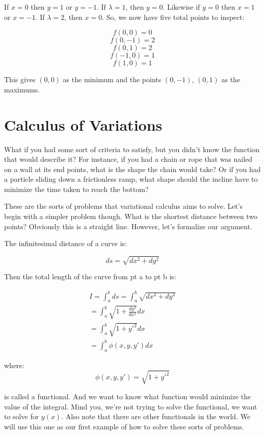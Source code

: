 \documentclass{article}
\begin{document}
If $x = 0$ then $y = 1$ or $y = -1$.  If $\lambda = 1$, then $y = 0$.  Likewise if $y = 0$ then $x = 1$ or $x= -1$.  If $\lambda = 2$, then $x = 0$.  So, we now have five total points to inspect:

$$f( 0, 0 ) = 0$$
$$f( 0, -1 ) = 2$$
$$f( 0, 1 ) = 2$$
$$f( -1, 0 ) = 1$$
$$f( 1, 0 ) = 1$$

This gives $( 0, 0 )$ as the minimum and the points $( 0, -1 )$, $( 0, 1 )$ as the maximums.




%
%
\newpage
\section{Calculus of Variations}

What if you had some sort of criteria to satisfy, but you didn't know the function that would describe it?  For instance, if you had a chain or rope that was nailed on a wall at its end points, what is the shape the chain would take?  Or if you had a particle sliding down a frictionless ramp, what shape should the incline have to minimize the time taken to reach the bottom?

These are the sorts of problems that variational calculus aims to solve.  Let's begin with a simpler problem though.  What is the shortest distance between two points?  Obviously this is a straight line.  However, let's formalize our argument.

The infinitesimal distance of a curve is:


\begin{equation}
ds = \sqrt{ dx^2 + dy^2 }
\end{equation}

Then the total length of the curve from pt a to pt b is:

\begin{align*}
I = \int_{a}^{b} ds
= \int_{a}^{b} \sqrt{ dx^2 + dy^2 }\\
= \int_{a}^{b} \sqrt{ 1 + \frac{ dy^2 }{ dx^2 } } dx\\
= \int_{a}^{b} \sqrt{ 1 + y'^2 } dx\\
= \int_{a}^{b} \phi( x, y, y' ) dx
\end{align*}

where:
$$\phi( x, y, y' ) = \sqrt{ 1 + y'^2 }$$

is called a functional.  And we want to know what function would minimize the value of the integral.  Mind you, we're not trying to solve the functional, we want to solve for $y( x )$.  Also note that there are other functionals in the world.  We will use this one as our first example of how to solve these sorts of problems.
\end{document}
